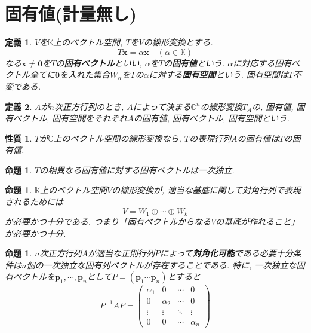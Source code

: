 \documentclass[a4j,dvipdfmx]{jsarticle}
\newcommand{\C}{\mathbb{C}}
\newcommand{\K}{\mathbb{K}}
\theoremstyle{mystyle}
\newtheorem*{definition}{定義}
\newtheorem{proposition}[theorem]{命題}
\newtheorem*{property}{性質}
\begin{document}
\section{固有値(計量無し)}
    \begin{definition}
        $V$を$\K$上のベクトル空間, $T$を$V$の線形変換とする.
        \begin{equation*}
            T\bm{x}=\alpha \bm{x}\quad (\alpha\in\K)
        \end{equation*}
        なる$\bm{x}\neq\bm{0}$を$T$の\textbf{固有ベクトル}といい, $\alpha$を$T$の\textbf{固有値}という. $\alpha$に対応する固有ベクトル全てに$\bm{0}$を入れた集合$W_\alpha$を$T$の$\alpha$に対する\textbf{固有空間}という. 固有空間は$T$不変である.
    \end{definition}
    \begin{definition}
        $A$が$n$次正方行列のとき, $A$によって決まる\underline{$\C^n$}の線形変換$T_A$の, 固有値, 固有ベクトル, 固有空間をそれぞれ$A$の固有値, 固有ベクトル, 固有空間という.
    \end{definition}
    \begin{property}
        $T$が$\C$上のベクトル空間の線形変換なら, $T$の表現行列$A$の固有値は$T$の固有値.
    \end{property}
    \begin{proposition}
        $T$の相異なる固有値に対する固有ベクトルは一次独立.
    \end{proposition}
    \begin{proposition}
        $\K$上のベクトル空間$V$の線形変換が, 適当な基底に関して対角行列で表現されるためには
        \begin{equation*}
            V=W_1\oplus\cdots\oplus W_k
        \end{equation*}
        が必要かつ十分である. つまり「固有ベクトルからなる$V$の基底が作れること」が必要かつ十分.
    \end{proposition}
    \begin{proposition}
        $n$次正方行列$A$が適当な正則行列$P$によって\textbf{対角化可能}である必要十分条件は$n$個の一次独立な固有列ベクトルが存在することである. 特に, 一次独立な固有ベクトルを$\bm{p}_1,\cdots,\bm{p}_n$として$P=(\bm{p}_1\cdots\bm{p}_n)$とすると
        \begin{equation*}
            P^{-1}AP=\begin{pmatrix}
                \alpha_1 & 0 & \cdots & 0 \\
                0 & \alpha_2 & \cdots & 0 \\
                \vdots & \vdots & \ddots & \vdots \\
                0 & 0 & \cdots & \alpha_n
            \end{pmatrix}
        \end{equation*}
    \end{proposition}
\end{document}
